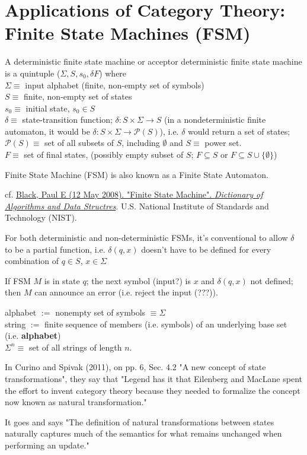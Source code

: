\section{Applications of Category Theory: Finite State Machines (FSM)}

\begin{definition}
	A deterministic finite state machine or acceptor deterministic finite state machine is a quintuple ($\Sigma, S, s_0, \delta F$) where \\
	$\Sigma \equiv $ input alphabet (finite, non-empty set of symbols) \\
 	$S \equiv $ finite, non-empty set of states \\
 	$s_0 \equiv $ initial state, $s_0 \in S$ \\
 	$\delta \equiv $ state-transition function; $\delta : S \times \Sigma \to S$ (in a nondeterministic finite automaton, it would be $\delta : S \times \Sigma \to \mathcal{P}(S)$), i.e. $\delta$ would return a set of states; $\mathcal{P}(S) \equiv $ set of all subsets of $S$, including $\emptyset$ and $S \equiv$ power set. \\
 	$F \equiv $ set of final states, (possibly empty subset of $S$; $F\subseteq S$ or $F \subseteq S \cup \lbrace \emptyset \rbrace$)

	Finite State Machine (FSM) is also known as a Finite State Automaton.
\end{definition}
cf. \href{https://xlinux.nist.gov/dads/HTML/finiteStateMachine.html}{Black, Paul E (12 May 2008). "Finite State Machine". \emph{Dictionary of Algorithms and Data Structres}}. U.S. National Institute of Standards and Technology (NIST).

For both deterministic and non-deterministic FSMs, it's conventional to allow $\delta$ to be a partial function, i.e. 
$\delta(q,x)$ doesn't have to be defined for every combination of $q \in S$, $x \in \Sigma$

If FSM $M$ is in state $q$; the next symbol (input?) is $x$ and $\delta(q,x)$ not defined; then $M$ can announce an error (i.e. reject the input (???)). 


\begin{definition}[Alphabet]
	alphabet $:= $ nonempty set of symbols $\equiv \Sigma$ \\
	string $:=$ finite sequence of members (i.e. symbols) of an underlying base set (i.e. \textbf{alphabet}) \\
	$\Sigma^n \equiv $ set of all strings of length $n$.
\end{definition}

In Curino and Spivak (2011)\cite{agat:SpCu2011}, on pp. 6, Sec. 4.2 "A new concept of state transformations", they say that "Legend has it that Eilenberg and MacLane spent the effort to invent category theory because they needed to formalize the concept now known as natural transformation." 

It goes and says "The definition of natural transformations between states naturally captures much of the semantics for what remains unchanged when performing an update."



